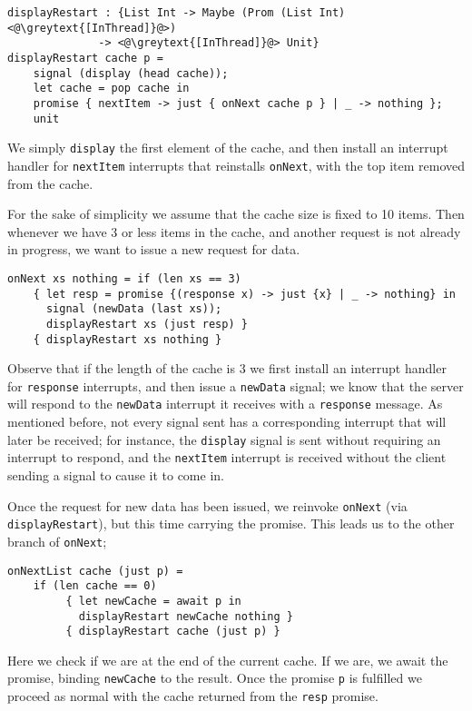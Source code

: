 \documentclass[msc,deptreport,cs]{infthesis} %
\newcommand{\code}[1]{\lstinline{#1}}
\newcommand{\greytext}[1]{\textcolor{black!40}{#1}}
\begin{document}
\begin{lstlisting}
displayRestart : {List Int -> Maybe (Prom (List Int) <@\greytext{[InThread]}@>)
              -> <@\greytext{[InThread]}@> Unit}
displayRestart cache p =
    signal (display (head cache));
    let cache = pop cache in
    promise { nextItem -> just { onNext cache p } | _ -> nothing };
    unit
\end{lstlisting}

\noindent We simply \code{display} the first element of the cache, and then
install an interrupt handler for \code{nextItem} interrupts that reinstalls
\code{onNext}, with the top item removed from the cache.

For the sake of simplicity we assume that the cache size is fixed to 10 items.
Then whenever we have 3 or less items in the cache, and another request is not
already in progress, we want to issue a new request for data.

\begin{lstlisting}
onNext xs nothing = if (len xs == 3)
    { let resp = promise {(response x) -> just {x} | _ -> nothing} in
      signal (newData (last xs));
      displayRestart xs (just resp) }
    { displayRestart xs nothing }
\end{lstlisting}

\noindent Observe that if the length of the cache is 3 we first install an
interrupt handler for \code{response} interrupts, and then issue a
\code{newData} signal; we know that the server will respond to the
\code{newData} interrupt it receives with a \code{response} message. As
mentioned before, not every signal sent has a corresponding interrupt that will
later be received; for instance, the \code{display} signal is sent without
requiring an interrupt to respond, and the \code{nextItem} interrupt is received
without the client sending a signal to cause it to come in.

Once the request for new data has been issued, we reinvoke \code{onNext} (via
\code{displayRestart}), but this time carrying the promise. This leads us to the
other branch of \code{onNext};

\begin{lstlisting}
onNextList cache (just p) =
    if (len cache == 0)
         { let newCache = await p in
           displayRestart newCache nothing }
         { displayRestart cache (just p) }
\end{lstlisting}

\noindent Here we check if we are at the end of the current cache. If we are, we
await the promise, binding \code{newCache} to the result. Once the promise
\code{p} is fulfilled we proceed as normal with the cache returned from the
\code{resp} promise.
\end{document}

